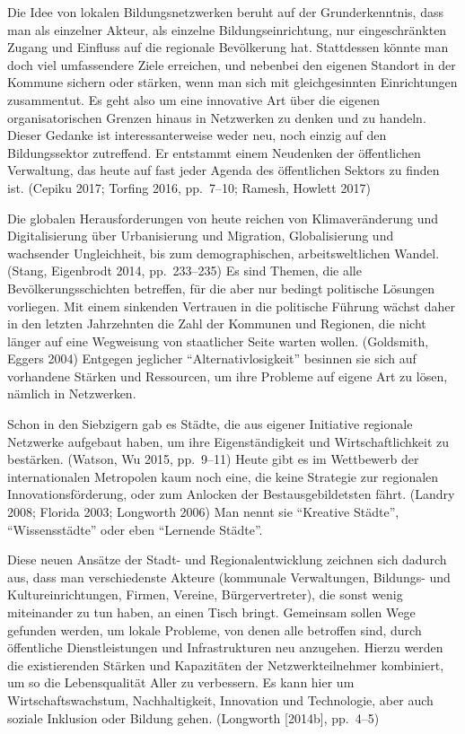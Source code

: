 \documentclass[a4paper,
fontsize=11pt,
oneside,
numbers=noperiodatend,
parskip=half-,
bibliography=totoc,
final
]{scrartcl}
\begin{document}
Die Idee von lokalen Bildungsnetzwerken beruht auf der Grunderkenntnis,
dass man als einzelner Akteur, als einzelne Bildungseinrichtung, nur
eingeschränkten Zugang und Einfluss auf die regionale Bevölkerung hat.
Stattdessen könnte man doch viel umfassendere Ziele erreichen, und
nebenbei den eigenen Standort in der Kommune sichern oder stärken, wenn
man sich mit gleichgesinnten Einrichtungen zusammentut. Es geht also um
eine innovative Art über die eigenen organisatorischen Grenzen hinaus in
Netzwerken zu denken und zu handeln. Dieser Gedanke ist
interessanterweise weder neu, noch einzig auf den Bildungssektor
zutreffend. Er entstammt einem Neudenken der öffentlichen Verwaltung,
das heute auf fast jeder Agenda des öffentlichen Sektors zu finden ist.
(Cepiku 2017; Torfing 2016, pp.~7--10; Ramesh, Howlett 2017)

Die globalen Herausforderungen von heute reichen von Klimaveränderung
und Digitalisierung über Urbanisierung und Migration, Globalisierung und
wachsender Ungleichheit, bis zum demographischen, arbeitsweltlichen
Wandel. (Stang, Eigenbrodt 2014, pp.~233--235) Es sind Themen, die alle
Bevölkerungsschichten betreffen, für die aber nur bedingt politische
Lösungen vorliegen. Mit einem sinkenden Vertrauen in die politische
Führung wächst daher in den letzten Jahrzehnten die Zahl der Kommunen
und Regionen, die nicht länger auf eine Wegweisung von staatlicher Seite
warten wollen. (Goldsmith, Eggers 2004) Entgegen jeglicher
\enquote{Alternativlosigkeit} besinnen sie sich auf vorhandene Stärken
und Ressourcen, um ihre Probleme auf eigene Art zu lösen, nämlich in
Netzwerken.

Schon in den Siebzigern gab es Städte, die aus eigener Initiative
regionale Netzwerke aufgebaut haben, um ihre Eigenständigkeit und
Wirtschaftlichkeit zu bestärken. (Watson, Wu 2015, pp.~9--11) Heute gibt
es im Wettbewerb der internationalen Metropolen kaum noch eine, die
keine Strategie zur regionalen Innovationsförderung, oder zum Anlocken
der Bestausgebildetsten fährt. (Landry 2008; Florida 2003; Longworth
2006) Man nennt sie \enquote{Kreative Städte}, \enquote{Wissensstädte}
oder eben \enquote{Lernende Städte}.

Diese neuen Ansätze der Stadt- und Regionalentwicklung zeichnen sich
dadurch aus, dass man verschiedenste Akteure (kommunale Verwaltungen,
Bildungs- und Kultureinrichtungen, Firmen, Vereine, Bürgervertreter),
die sonst wenig miteinander zu tun haben, an einen Tisch bringt.
Gemeinsam sollen Wege gefunden werden, um lokale Probleme, von denen
alle betroffen sind, durch öffentliche Dienstleistungen und
Infrastrukturen neu anzugehen. Hierzu werden die existierenden Stärken
und Kapazitäten der Netzwerkteilnehmer kombiniert, um so die
Lebensqualität Aller zu verbessern. Es kann hier um Wirtschaftswachstum,
Nachhaltigkeit, Innovation und Technologie, aber auch soziale Inklusion
oder Bildung gehen. (Longworth {[}2014b{]}, pp.~4--5)
\end{document}
